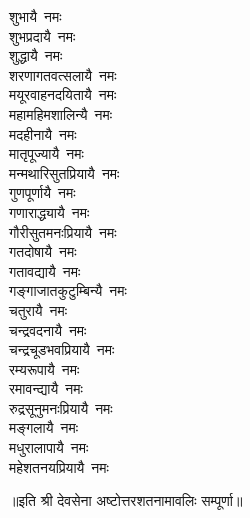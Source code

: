 \begin{flushleft}
\begin{multicols}{2}
शुभायै~नमः\\
शुभप्रदायै~नमः\\
शुद्धायै~नमः\\
शरणागतवत्सलायै~नमः\\
मयूरवाहनदयितायै~नमः\\
महामहिमशालिन्यै~नमः\hfill{}\\
मदहीनायै~नमः\\
मातृपूज्यायै~नमः\\
मन्मथारिसुतप्रियायै~नमः\\
गुणपूर्णायै~नमः\\
गणाराद्ध्यायै~नमः\\
गौरीसुतमनःप्रियायै~नमः\\
गतदोषायै~नमः\\
गतावद्यायै~नमः\\
गङ्गाजातकुटुम्बिन्यै~नमः\\
चतुरायै~नमः\hfill{}\\
चन्द्रवदनायै~नमः\\
चन्द्रचूडभवप्रियायै~नमः\\
रम्यरूपायै~नमः\\
रमावन्द्यायै~नमः\\
रुद्रसूनुमनःप्रियायै~नमः\\
मङ्गलायै~नमः\\
मधुरालापायै~नमः\\
महेशतनयप्रियायै~नमः\\
\end{multicols}
\end{flushleft}
॥इति श्री देवसेना अष्टोत्तरशतनामावलिः सम्पूर्णा॥
